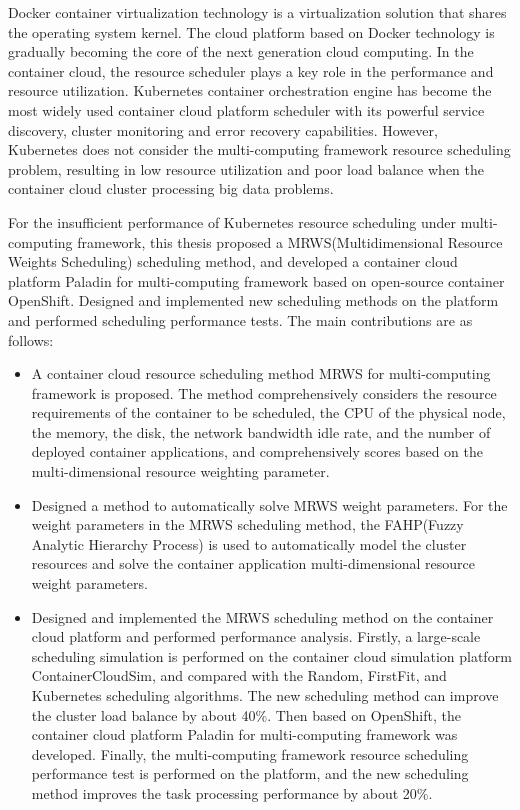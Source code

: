 \begin{eabstract}
Docker container virtualization technology is a virtualization solution that shares the operating system kernel. The cloud platform based on Docker technology is gradually becoming the core of the next generation cloud computing. In the container cloud, the resource scheduler plays a key role in the performance and resource utilization. Kubernetes container orchestration engine has become the most widely used container cloud platform scheduler with its powerful service discovery, cluster monitoring and error recovery capabilities. However, Kubernetes does not consider the multi-computing framework resource scheduling problem, resulting in low resource utilization and poor load balance when the container cloud cluster processing big data problems.

For the insufficient performance of Kubernetes resource scheduling under multi-computing framework, this thesis proposed a MRWS(Multidimensional Resource Weights Scheduling) scheduling method, and developed a container cloud platform Paladin for multi-computing framework based on open-source container OpenShift. Designed and implemented new scheduling methods on the platform and performed scheduling performance tests. The main contributions are as follows:

\begin{itemize}
	\item A container cloud resource scheduling method MRWS for multi-computing framework is proposed. The method comprehensively considers the resource requirements of the container to be scheduled, the CPU of the physical node, the memory, the disk, the network bandwidth idle rate, and the number of deployed container applications, and comprehensively scores based on the multi-dimensional resource weighting parameter.
	\item Designed a method to automatically solve MRWS weight parameters. For the weight parameters in the MRWS scheduling method, the FAHP(Fuzzy Analytic Hierarchy Process) is used to automatically model the cluster resources and solve the container application multi-dimensional resource weight parameters.
	\item Designed and implemented the MRWS scheduling method on the container cloud platform and performed performance analysis. Firstly, a large-scale scheduling simulation is performed on the container cloud simulation platform ContainerCloudSim, and compared with the Random, FirstFit, and Kubernetes scheduling algorithms. The new scheduling method can improve the cluster load balance by about 40\%. Then based on OpenShift, the container cloud platform Paladin for multi-computing framework was developed. Finally, the multi-computing framework resource scheduling performance test is performed on the platform, and the new scheduling method improves the task processing performance by about 20\%.
\end{itemize}
\end{eabstract}











